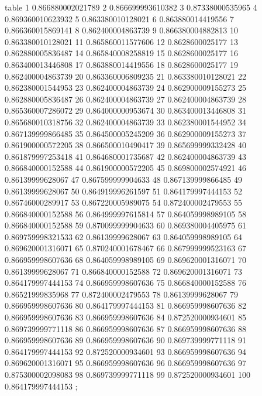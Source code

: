 table {%
	1 0.866880002021789
	2 0.866699993610382
	3 0.87338000535965
	4 0.869360010623932
	5 0.863380010128021
	6 0.863880014419556
	7 0.866360015869141
	8 0.862400004863739
	9 0.866380004882813
	10 0.863380010128021
	11 0.865860011577606
	12 0.8628600025177
	13 0.862880005836487
	14 0.865840008258819
	15 0.8628600025177
	16 0.863400013446808
	17 0.863880014419556
	18 0.8628600025177
	19 0.862400004863739
	20 0.863360006809235
	21 0.863380010128021
	22 0.862380001544953
	23 0.862400004863739
	24 0.862900009155273
	25 0.862880005836487
	26 0.862400004863739
	27 0.862400004863739
	28 0.865360007286072
	29 0.864000000953674
	30 0.863400013446808
	31 0.865680010318756
	32 0.862400004863739
	33 0.862380001544952
	34 0.867139999866485
	35 0.864500005245209
	36 0.862900009155273
	37 0.861900000572205
	38 0.866500010490417
	39 0.865699999332428
	40 0.861879997253418
	41 0.864680001735687
	42 0.862400004863739
	43 0.866840000152588
	44 0.861900000572205
	45 0.869800002574921
	46 0.86139999628067
	47 0.867599999904633
	48 0.867139999866485
	49 0.86139999628067
	50 0.864919996261597
	51 0.864179997444153
	52 0.86746000289917
	53 0.867220005989075
	54 0.872400002479553
	55 0.866840000152588
	56 0.864999997615814
	57 0.864059998989105
	58 0.866840000152588
	59 0.870099999904633
	60 0.869380004405975
	61 0.869759998321533
	62 0.86139999628067
	63 0.864059998989105
	64 0.869620001316071
	65 0.870240001678467
	66 0.867999999523163
	67 0.866959998607636
	68 0.864059998989105
	69 0.869620001316071
	70 0.86139999628067
	71 0.866840000152588
	72 0.869620001316071
	73 0.864179997444153
	74 0.866959998607636
	75 0.866840000152588
	76 0.86521999835968
	77 0.872400002479553
	78 0.86139999628067
	79 0.866959998607636
	80 0.864179997444153
	81 0.866959998607636
	82 0.866959998607636
	83 0.866959998607636
	84 0.872520000934601
	85 0.869739999771118
	86 0.866959998607636
	87 0.866959998607636
	88 0.866959998607636
	89 0.866959998607636
	90 0.869739999771118
	91 0.864179997444153
	92 0.872520000934601
	93 0.866959998607636
	94 0.869620001316071
	95 0.866959998607636
	96 0.866959998607636
	97 0.875300002098083
	98 0.869739999771118
	99 0.872520000934601
	100 0.864179997444153
};
